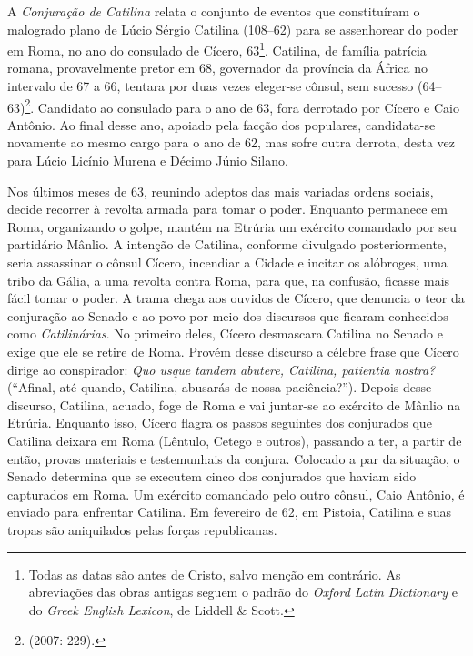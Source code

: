 




A \emph{Conjuração de Catilina} relata o conjunto de eventos que constituíram o
malogrado plano de Lúcio Sérgio Catilina (108--62) para se assenhorear do poder
em Roma, no ano do consulado de Cícero, 63\footnote{Todas as datas são antes de Cristo, salvo menção em contrário. As abreviações das obras antigas seguem o padrão do \emph{Oxford Latin Dictionary} e do \emph{Greek English Lexicon}, de Liddell \& Scott.}. Catilina, de família patrícia
romana, provavelmente pretor  em 68, governador da província da África no
intervalo de 67 a 66, tentara por duas vezes eleger-se cônsul, sem sucesso
(64--63)\footnote{ (2007: 229).}. Candidato ao consulado para o ano de
63, fora derrotado por Cícero e Caio Antônio. Ao final desse ano, apoiado pela
facção dos populares, candidata-se novamente ao mesmo cargo para o ano de 62,
mas sofre outra derrota, desta vez para Lúcio Licínio Murena e Décimo Júnio
Silano.

Nos últimos meses de 63, reunindo adeptos das mais variadas ordens sociais,
decide recorrer à revolta armada para tomar o poder. Enquanto permanece em
Roma, organizando o golpe, mantém na Etrúria um exército comandado por seu
partidário Mânlio. A intenção de Catilina, conforme divulgado posteriormente,
seria assassinar o cônsul Cícero, incendiar a Cidade e incitar os alóbroges,
uma tribo da Gália, a uma revolta contra Roma, para que, na confusão, ficasse
mais fácil tomar o poder. A trama chega aos ouvidos de Cícero, que denuncia o
teor da conjuração ao Senado e ao povo por meio dos discursos que ficaram
conhecidos como \emph{Catilinárias}. No primeiro deles, Cícero desmascara
Catilina no Senado e exige que ele se retire de Roma. Provém desse discurso a
célebre frase que Cícero dirige ao conspirador: \emph{Quo usque tandem abutere,
Catilina, patientia nostra? }(“Afinal, até quando, Catilina, abusarás de nossa
paciência?”).  Depois desse discurso, Catilina, acuado, foge de Roma e vai
juntar-se ao exército de Mânlio na Etrúria. Enquanto isso, Cícero flagra os
passos seguintes dos conjurados que Catilina deixara em Roma (Lêntulo, Cetego e
outros), passando a ter, a partir de então, provas materiais e testemunhais da
conjura. Colocado a par da situação, o Senado determina que se executem cinco
dos conjurados que haviam sido capturados em Roma.  Um exército comandado pelo
outro cônsul, Caio Antônio, é enviado para enfrentar Catilina.  Em fevereiro de
62, em Pistoia, Catilina e suas tropas são aniquilados pelas forças
republicanas. 

